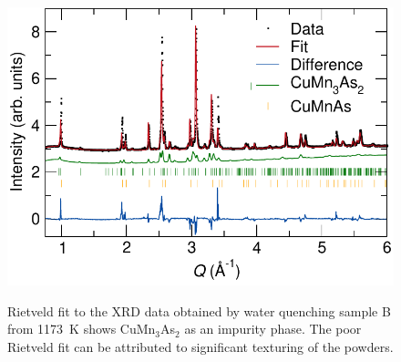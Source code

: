 \documentclass[letterpaper,10pt,doublespacing,edeposit]{uiucthesis2020}
\begin{document}
\begin{mainmatter}
\begin{figure}
\centering\includegraphics[width=0.7\columnwidth]{figures/ch7/quenched_samples_cropped.pdf} \\
\caption{\label{fig:quenched_samples}
Rietveld fit to the XRD data obtained by water quenching sample B from 1173~K shows CuMn$_3$As$_2$ as an impurity phase. The poor Rietveld fit can be attributed to significant texturing of the powders.%
} 
\end{figure}




\end{mainmatter}
\end{document}

